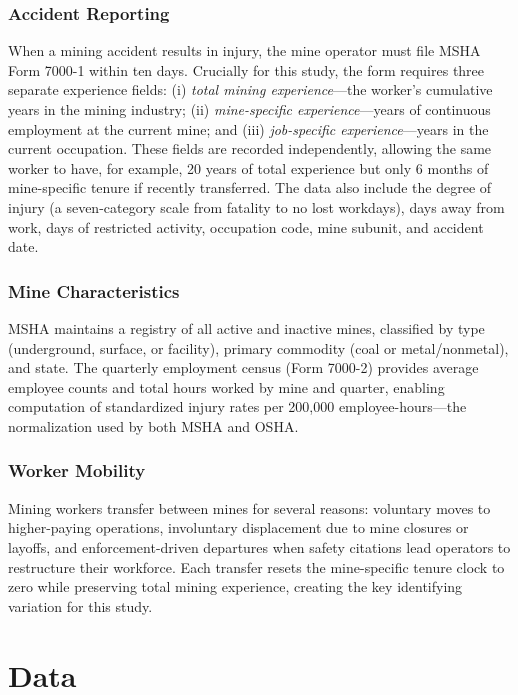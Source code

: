 \documentclass[12pt]{article}
\begin{document}
\subsubsection*{Accident Reporting} When a mining accident results in injury, the mine operator must file MSHA Form 7000-1 within ten days. Crucially for this study, the form requires three separate experience fields: (i) \textit{total mining experience}---the worker's cumulative years in the mining industry; (ii) \textit{mine-specific experience}---years of continuous employment at the current mine; and (iii) \textit{job-specific experience}---years in the current occupation. These fields are recorded independently, allowing the same worker to have, for example, 20 years of total experience but only 6 months of mine-specific tenure if recently transferred. The data also include the degree of injury (a seven-category scale from fatality to no lost workdays), days away from work, days of restricted activity, occupation code, mine subunit, and accident date.

\subsubsection*{Mine Characteristics} MSHA maintains a registry of all active and inactive mines, classified by type (underground, surface, or facility), primary commodity (coal or metal/nonmetal), and state. The quarterly employment census (Form 7000-2) provides average employee counts and total hours worked by mine and quarter, enabling computation of standardized injury rates per 200,000 employee-hours---the normalization used by both MSHA and OSHA.

\subsubsection*{Worker Mobility} Mining workers transfer between mines for several reasons: voluntary moves to higher-paying operations, involuntary displacement due to mine closures or layoffs, and enforcement-driven departures when safety citations lead operators to restructure their workforce. Each transfer resets the mine-specific tenure clock to zero while preserving total mining experience, creating the key identifying variation for this study.


\section{Data}\label{sec:data}
\end{document}
